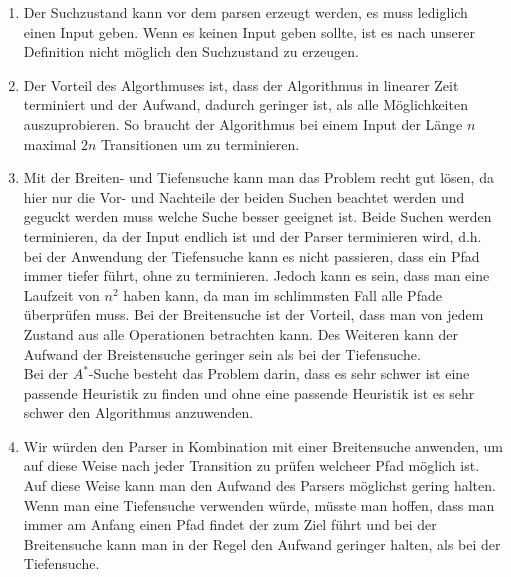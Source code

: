 \documentclass[a4paper]{scrartcl}
\begin{document}
\begin{enumerate}
\begin{enumerate}
			\item
				Der Suchzustand kann vor dem parsen erzeugt werden, es muss lediglich einen Input geben. 
				Wenn es keinen Input geben sollte, ist es nach unserer Definition nicht möglich den 
				Suchzustand zu erzeugen. 
				
			\item
				Der Vorteil des Algorthmuses ist, dass der Algorithmus in linearer Zeit terminiert und der
				Aufwand, dadurch geringer ist, als alle Möglichkeiten auszuprobieren. So braucht der 
				Algorithmus bei einem Input der Länge $n$ maximal $2n$ Transitionen um zu terminieren.
				
			\item
				Mit der Breiten- und Tiefensuche kann man das Problem recht gut lösen, da hier nur 
				die Vor- und Nachteile der beiden Suchen beachtet werden und geguckt werden muss welche 
				Suche besser geeignet ist. Beide Suchen werden terminieren, da der Input endlich ist und
				der Parser terminieren wird, d.h. bei der Anwendung der Tiefensuche kann es nicht 
				passieren, dass ein Pfad immer tiefer führt, ohne zu terminieren. Jedoch kann es 
				sein, dass man eine Laufzeit von $n^2$ haben kann, da man im schlimmsten Fall alle
				Pfade überprüfen muss. Bei der Breitensuche ist der Vorteil, dass man von jedem Zustand
				aus alle Operationen betrachten kann. Des Weiteren kann der Aufwand der Breistensuche
				geringer sein als bei der Tiefensuche. \\
				Bei der $A^*$-Suche besteht das Problem darin, dass es sehr schwer ist eine passende
				Heuristik zu finden und ohne eine passende Heuristik ist es sehr schwer den Algorithmus
				anzuwenden. \\
				
			\item
				Wir würden den Parser in Kombination mit einer Breitensuche anwenden, um auf diese Weise
				nach jeder Transition zu prüfen welcheer Pfad möglich ist. Auf diese Weise kann man den 
				Aufwand des Parsers möglichst gering halten. Wenn man eine Tiefensuche verwenden würde,
				müsste man hoffen, dass man immer am Anfang einen Pfad findet der zum Ziel führt und bei 
				der Breitensuche kann man in der Regel den Aufwand geringer halten, als bei der 
				Tiefensuche.
				
				
				
				
		\end{enumerate}

\end{enumerate}
\end{document}
